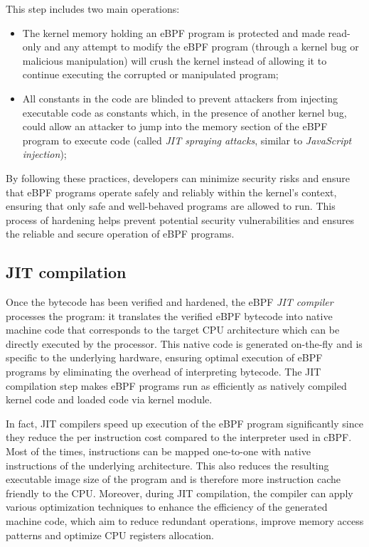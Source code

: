 This step includes two main operations:

\begin{itemize}
	\item 
		The kernel memory holding an eBPF program is protected and made read-only and any attempt to modify the eBPF program (through a kernel bug or malicious manipulation) will crush the kernel instead of allowing it to continue executing the corrupted or manipulated program;
	\item 
		All constants in the code are blinded to prevent attackers from injecting executable code as constants which, in the presence of another kernel bug, could allow an attacker to jump into the memory section of the eBPF program to execute code (called \textit{JIT spraying attacks}, similar to \textit{JavaScript injection});
\end{itemize}

By following these practices, developers can minimize security risks and ensure that eBPF programs operate safely and reliably within the kernel's context, ensuring that only safe and well-behaved programs are allowed to run.
This process of hardening helps prevent potential security vulnerabilities and ensures the reliable and secure operation of eBPF programs.

\subsection{JIT compilation}

Once the bytecode has been verified and hardened, the eBPF \textit{JIT compiler} processes the program: it translates the verified eBPF bytecode into native machine code that corresponds to the target CPU architecture which can be directly executed by the processor. 
This native code is generated on-the-fly and is specific to the underlying hardware, ensuring optimal execution of eBPF programs by eliminating the overhead of interpreting bytecode.
The JIT compilation step makes eBPF programs run as efficiently as natively compiled kernel code and loaded code via kernel module.

In fact, JIT compilers speed up execution of the eBPF program significantly since they reduce the per instruction cost compared to the interpreter used in cBPF. 
Most of the times, instructions can be mapped one-to-one with native instructions of the underlying architecture. 
This also reduces the resulting executable image size of the program and is therefore more instruction cache friendly to the CPU.
Moreover, during JIT compilation, the compiler can apply various optimization techniques to enhance the efficiency of the generated machine code, which aim to reduce redundant operations, improve memory access patterns and optimize CPU registers allocation.

